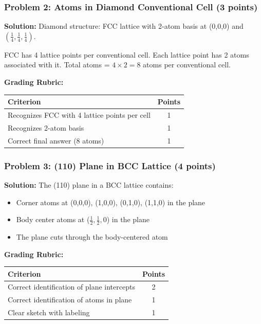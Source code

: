 \documentclass[12pt,a4paper]{article}
\begin{document}
\subsubsection*{Problem 2: Atoms in Diamond Conventional Cell (3 points)}
\textbf{Solution:}
Diamond structure: FCC lattice with 2-atom basis at (0,0,0) and $(\frac{1}{4}, \frac{1}{4}, \frac{1}{4})$.

FCC has 4 lattice points per conventional cell.
Each lattice point has 2 atoms associated with it.
Total atoms = $4 \times 2 = 8$ atoms per conventional cell.

\textbf{Grading Rubric:}
\begin{table}[h]
\centering
\begin{tabular}{|p{10cm}|c|}
\hline
\textbf{Criterion} & \textbf{Points} \\
\hline
Recognizes FCC with 4 lattice points per cell & 1 \\
Recognizes 2-atom basis & 1 \\
Correct final answer (8 atoms) & 1 \\
\hline
\end{tabular}
\end{table}

\subsubsection*{Problem 3: (110) Plane in BCC Lattice (4 points)}
\textbf{Solution:}
The (110) plane in a BCC lattice contains:
\begin{itemize}
    \item Corner atoms at (0,0,0), (1,0,0), (0,1,0), (1,1,0) in the plane
    \item Body center atoms at ($\frac{1}{2}, \frac{1}{2}, 0$) in the plane
    \item The plane cuts through the body-centered atom
\end{itemize}

\textbf{Grading Rubric:}
\begin{table}[h]
\centering
\begin{tabular}{|p{10cm}|c|}
\hline
\textbf{Criterion} & \textbf{Points} \\
\hline
Correct identification of plane intercepts & 2 \\
Correct identification of atoms in plane & 1 \\
Clear sketch with labeling & 1 \\
\hline
\end{tabular}
\end{table}
\end{document}
